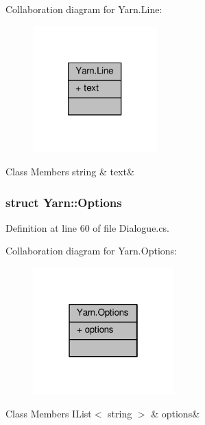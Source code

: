 Collaboration diagram for Yarn.\-Line\-:
\nopagebreak
\begin{figure}[H]
\begin{center}
\leavevmode
\includegraphics[width=136pt]{a00393}
\end{center}
\end{figure}
\begin{DoxyFields}{Class Members}
\hypertarget{a00053_a81d1f04bbb4cf6642d2bd685bda1da20}{string}\label{a00053_a81d1f04bbb4cf6642d2bd685bda1da20}
&
text&
\\
\hline

\end{DoxyFields}
\label{a00383}
\hypertarget{a00053_a00383}{}
\subsubsection{struct Yarn\-:\-:Options}


Definition at line 60 of file Dialogue.\-cs.



Collaboration diagram for Yarn.\-Options\-:
\nopagebreak
\begin{figure}[H]
\begin{center}
\leavevmode
\includegraphics[width=154pt]{a00394}
\end{center}
\end{figure}
\begin{DoxyFields}{Class Members}
\hypertarget{a00053_ae8c616d923ceeeed192a9436c55d9917}{I\-List$<$ string $>$}\label{a00053_ae8c616d923ceeeed192a9436c55d9917}
&
options&
\\
\hline

\end{DoxyFields}
\label{a00376}
\hypertarget{a00053_a00376}{}
